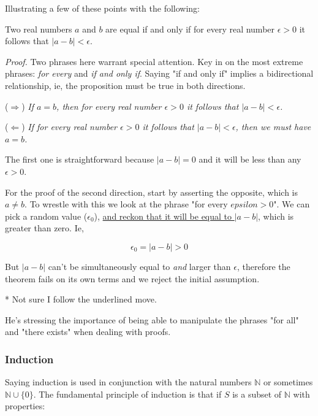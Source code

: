 \documentclass{article}
\numberwithin{equation}{subsection}
\numberwithin{theo}{subsection}
\begin{document}
Illustrating a few of these points with the following:

\begin{theo}
    \label{realnumequal}
    Two real numbers $a$ and $b$ are equal if and only if for every real number
    $\epsilon > 0$ it follows that $\lvert a-b \rvert < \epsilon$.
\end{theo}

\emph{Proof.} Two phrases here warrant special attention. Key in on the most
extreme phrases: \emph{for every} and \emph{if and only if}. Saying "if and only
if" implies a bidirectional relationship, ie, the proposition must be true in
both directions.

($\Rightarrow$) \emph{If $a=b$, then for every real number $\epsilon > 0$ it
follows that $\lvert a-b \rvert < \epsilon$.}

($\Leftarrow$) \emph{If for every real number $\epsilon > 0$ it follows that
    $\lvert a-b \rvert < \epsilon$, then we must have $a=b$.}

The first one is straightforward because $\lvert a-b \rvert = 0$ and it will be
less than any $\epsilon > 0$.

For the proof of the second direction, start by asserting the opposite, which is
$a \neq b$. To wrestle with this we look at the phrase "for every $epsilon >
0$". We can pick a random value ($\epsilon_0$), \underline{and reckon that it will be equal
to $\lvert a-b \rvert$}, which is greater than zero. Ie,

\begin{equation*}
    \epsilon_0 = \lvert a-b \rvert > 0
\end{equation*}

But $\lvert a-b \rvert$ can't be simultaneously equal to \emph{and} larger than
$\epsilon$, therefore the theorem fails on its own terms and we reject the
initial assumption.

* Not sure I follow the underlined move.

He's stressing the importance of being able to manipulate the phrases "for all"
and "there exists" when dealing with proofs.

\subsubsection*{Induction}

Saying induction is used in conjunction with the natural numbers $\mathbb{N}$ or
sometimes $\mathbb{N} \cup \{0\}$. The fundamental principle of induction is
that if $S$ is a subset of $\mathbb{N}$ with properties:
\end{document}
